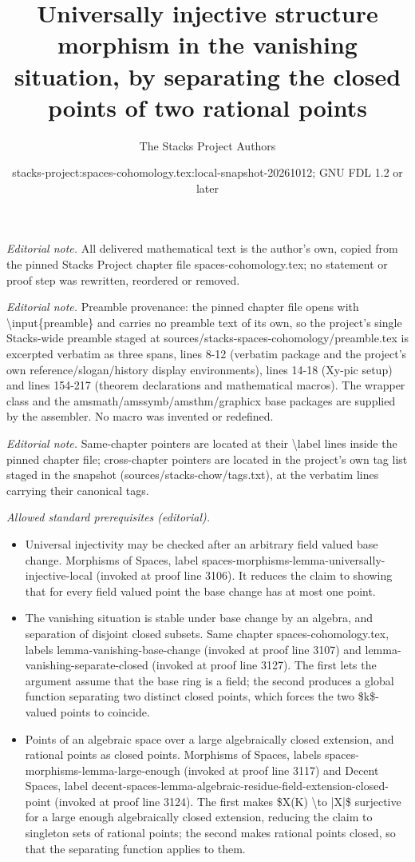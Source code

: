 \documentclass[10pt,a4paper]{amsart}
\title{Universally injective structure morphism in the vanishing situation, by separating the closed points of two rational points}
\author{The Stacks Project Authors}
\date{stacks-project:spaces-cohomology.tex:local-snapshot-20261012; GNU FDL 1.2 or later}
\theoremstyle{plain}
\theoremstyle{definition}
\theoremstyle{remark}
\numberwithin{equation}{subsection}
\begin{document}
\maketitle
\noindent\textit{Editorial note.} All delivered mathematical text is the author's own, copied from the pinned Stacks Project chapter file spaces-cohomology.tex; no statement or proof step was rewritten, reordered or removed.\par\medskip
\noindent\textit{Editorial note.} Preamble provenance: the pinned chapter file opens with \textbackslash{}input\{preamble\} and carries no preamble text of its own, so the project's single Stacks-wide preamble staged at sources/stacks-spaces-cohomology/preamble.tex is excerpted verbatim as three spans, lines 8-12 (verbatim package and the project's own reference/slogan/history display environments), lines 14-18 (Xy-pic setup) and lines 154-217 (theorem declarations and mathematical macros). The wrapper class and the amsmath/amssymb/amsthm/graphicx base packages are supplied by the assembler. No macro was invented or redefined.\par\medskip
\noindent\textit{Editorial note.} Same-chapter pointers are located at their \textbackslash{}label lines inside the pinned chapter file; cross-chapter pointers are located in the project's own tag list staged in the snapshot (sources/stacks-chow/tags.txt), at the verbatim lines carrying their canonical tags.\par\medskip
\noindent\textit{Allowed standard prerequisites (editorial).}\begin{itemize}
\item Universal injectivity may be checked after an arbitrary field valued base change. Morphisms of Spaces, label spaces-morphisms-lemma-universally-injective-local (invoked at proof line 3106). It reduces the claim to showing that for every field valued point the base change has at most one point.
\item The vanishing situation is stable under base change by an algebra, and separation of disjoint closed subsets. Same chapter spaces-cohomology.tex, labels lemma-vanishing-base-change (invoked at proof line 3107) and lemma-vanishing-separate-closed (invoked at proof line 3127). The first lets the argument assume that the base ring is a field; the second produces a global function separating two distinct closed points, which forces the two \$k\$-valued points to coincide.
\item Points of an algebraic space over a large algebraically closed extension, and rational points as closed points. Morphisms of Spaces, labels spaces-morphisms-lemma-large-enough (invoked at proof line 3117) and Decent Spaces, label decent-spaces-lemma-algebraic-residue-field-extension-closed-point (invoked at proof line 3124). The first makes \$X(K) \textbackslash{}to |X|\$ surjective for a large enough algebraically closed extension, reducing the claim to singleton sets of rational points; the second makes rational points closed, so that the separating function applies to them.
\end{itemize}\medskip
\end{document}

